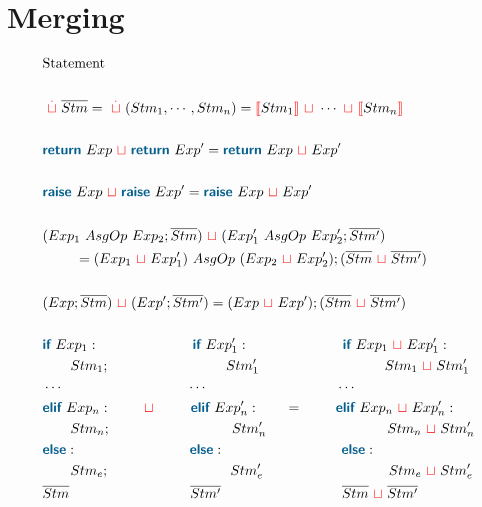\documentclass{thesis}
\newcommand{\mblue}[1]{\textbf{\textsf{\color{MidnightBlue}#1}}}
\newcommand{\nl}[1]{{\color{red}{\llbracket}}#1{\color{red}{\rrbracket}}} %
\newcommand{\mg}{~{\color{red}{\sqcup}}~} %
\begin{document}
\section{Merging}
\begin{align*}
  & \text{Statement}\\
  \\
  & \overset{\color{red}.}{\mg} \overline{Stm} = \overset{\color{red}.}{\mg}(Stm_1, \cdots ,Stm_n) = \nl{Stm_1} \mg \cdots \mg \nl{Stm_n}\\
  \\
  & \mblue{return}~Exp \mg \mblue{return}~Exp' = \mblue{return}~Exp \mg Exp'\\
  \\
  & \mblue{raise}~ Exp \mg \mblue{raise}~ Exp' = \mblue{raise}~ Exp \mg Exp'\\
  \\
  & (Exp_1 ~AsgOp~ Exp_2 ; \overline{Stm}) \mg (Exp'_1 ~AsgOp~ Exp'_2 ; \overline{Stm'})\\
  & ~~~~~~~ = (Exp_1 \mg Exp'_1) ~AsgOp~ (Exp_2 \mg Exp'_2) ; (\overline{Stm} \mg \overline{Stm'})\\
  \\
  & (Exp ; \overline{Stm}) \mg (Exp' ; \overline{Stm'}) = (Exp \mg Exp') ; (\overline{Stm} \mg \overline{Stm'})\\
  \\
  & \mblue{if}~Exp_1: ~~~~~~~~~~~~~~~~~~~~\mblue{if}~Exp'_1: ~~~~~~~~~~~~~~~~~~~~\mblue{if}~Exp_1 \mg Exp'_1:\\
  & ~~~~~~Stm_1; ~~~~~~~~~~~~~~~~~~~~~~~~~ Stm'_1 ~~~~~~~~~~~~~~~~~~~~~~~~~~~ Stm_1 \mg Stm'_1\\
  & \cdots ~~~~~~~~~~~~~~~~~~~~~~~~~~~\cdots ~~~~~~~~~~~~~~~~~~~~~~~~~~~~\cdots\\
  & \mblue{elif}~Exp_n: ~~~~~~\mg~~~~~~~\mblue{elif}~Exp'_n: ~~~~~~~=~~~~~~~\mblue{elif}~Exp_n \mg Exp'_n:\\
  & ~~~~~~Stm_n; ~~~~~~~~~~~~~~~~~~~~~~~~~~ Stm'_n ~~~~~~~~~~~~~~~~~~~~~~~~~~ Stm_n \mg Stm'_n\\
  & \mblue{else}:~~~~~~~~~~~~~~~~~~~~~~~~\mblue{else}:~~~~~~~~~~~~~~~~~~~~~~~~~\mblue{else}:~\\
  & ~~~~~~Stm_e; ~~~~~~~~~~~~~~~~~~~~~~~~~~ Stm'_e ~~~~~~~~~~~~~~~~~~~~~~~~~~~ Stm_e \mg Stm'_e\\
  & \overline{Stm} ~~~~~~~~~~~~~~~~~~~~~~~~~~ \overline{Stm'} ~~~~~~~~~~~~~~~~~~~~~~~~~~ \overline{Stm} \mg \overline{Stm'}\\

\end{align*}
\end{document}
